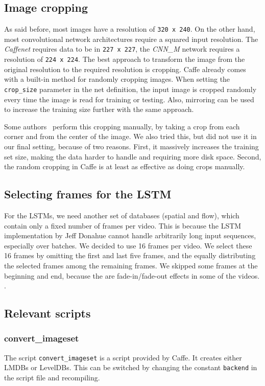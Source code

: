 \subsection{Image cropping}
As said before, most images have a resolution of \texttt{320 x 240}.
On the other hand, most convolutional network architectures require a squared input resolution.
The \emph{Caffenet} requires data to be in \texttt{227 x 227}, the \emph{CNN\_M} network requires a resolution of \texttt{224 x 224}.
The best approach to transform the image from the original resolution to the required resolution is cropping.
Caffe already comes with a built-in method for randomly cropping images.
When setting the \texttt{crop\_size} parameter in the net definition, the input image is cropped randomly every time the image is read for training or testing.
Also, mirroring can be used to increase the training size further with the same approach.

Some authors~\cite{ye2015evaluating} perform this cropping manually, by taking a crop from each corner and from the center of the image.
We also tried this, but did not use it in our final setting, because of two reasons.
First, it massively increases the training set size, making the data harder to handle and requiring more disk space.
Second, the random cropping in Caffe is at least as effective as doing crops manually.

\subsection{Selecting frames for the LSTM}
For the LSTMs, we need another set of databases (spatial and flow), which contain only a fixed number of frames per video.
This is because the LSTM implementation by Jeff Donahue cannot handle arbitrarily long input sequences, especially over batches.
We decided to use 16 frames per video.
We select these 16 frames by omitting the first and last five frames, and the equally distributing the selected frames among the remaining frames.
We skipped some frames at the beginning and end, because the are fade-in/fade-out effects in some of the videos.
.

\subsection{Relevant scripts}

\subsubsection{convert\_imageset}
The script \texttt{convert\_imageset} is a script provided by Caffe.
It creates either LMDBs or LevelDBs.
This can be switched by changing the constant \texttt{backend} in the script file and recompiling.

